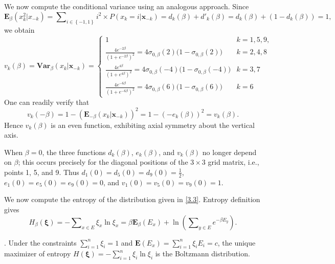 \documentclass[twoside]{article}
\begin{document}
We now compute the conditional variance using an analogous approach. Since
\[{{\boldsymbol{E}}_{\beta }}\left( x_{k}^{2}|{{x}_{-k}} \right)=\sum\nolimits_{i\in \left\{ -1,1 \right\}}{{{i}^{2}}\times P\left( {{x}_{k}}=i|{{\boldsymbol{x}}_{-k}} \right)}={{d}_{k}}\left( \beta \right)+{{{d}'}_{k}}\left( \beta \right)={{d}_{k}}\left( \beta \right)+\left( 1-{{d}_{k}}\left( \beta \right) \right)=1,\]
we obtain
\[
v_k(\beta) = {\boldsymbol{Var}_{\beta }}\left( {{x}_{k}}|{\boldsymbol{x}_{-k}} \right) =
\begin{cases}
    1 & k = 1, 5, 9, \\
    \frac{4e^{-2\beta}}{(1 + e^{-2\beta})^2}=4{\sigma }_{0 ,\beta}(2)\big(1-{\sigma }_{0 ,\beta}(2)\big) & k = 2, 4, 8 \\
    \frac{4e^{4\beta}}{(1 + e^{4\beta})^2}=4{\sigma }_{0 ,\beta}(-4)\big(1-{\sigma }_{0 ,\beta}(-4)\big) & k = 3, 7 \\
    \frac{4e^{-6\beta}}{(1 + e^{-6\beta})^2}=4{\sigma }_{0 ,\beta}(6)\big(1-{\sigma }_{0 ,\beta}(6)\big) & k = 6
\end{cases}
\]
One can readily verify that \[{{v}_{k}}\left( -\beta \right)=1-{{\left( {\boldsymbol{E}_{-\beta }}\left( {{x}_{k}}|{\boldsymbol{x}_{-k}} \right) \right)}^{2}}=1-{{\left( -{{e}_{k}}\left( \beta \right) \right)}^{2}}={{v}_{k}}\left( \beta \right).\] Hence ${{v}_{k}}\left( \beta \right)$ is an even function, exhibiting axial symmetry about the vertical axis.

When $\beta =0$, the three functions ${{d}_{k}}\left( \beta \right)$, ${{e}_{k}}\left( \beta \right)$, and ${{v}_{k}}\left( \beta \right)$ no longer depend on $\beta$; this occurs precisely for the diagonal positions of the $3\times 3$ grid matrix, i.e., points 1, 5, and 9.
 Thus ${{d}_{1}}\left( 0 \right)={{d}_{5}}\left( 0 \right)={{d}_{9}}\left( 0 \right)=\tfrac{1}{2}$, ${{e}_{1}}\left( 0 \right)={{e}_{5}}\left( 0 \right)={{e}_{9}}\left( 0 \right)=0$, and ${{v}_{1}}\left( 0 \right)={{v}_{5}}\left( 0 \right)={{v}_{9}}\left( 0 \right)=1$.

We now compute the entropy of the distribution given in \eqref{3.3}. Entropy definition gives
\[H_{\beta}(\boldsymbol{\xi}) = -\sum\nolimits_{x \in E} \xi_x \ln \xi_x = \beta \boldsymbol{E}_{\beta}(E_x) + \ln \left( \sum\nolimits_{y \in E} e^{-\beta E_y} \right).\]

\begin{pro} \label{pro3.7}
\citep{shams}. Under the constraints $\sum\nolimits_{i=1}^{n}{{{\xi }_{i}}}=1$ and $\boldsymbol{E}\left( {{E}_{x}} \right)=\sum\nolimits_{i=1}^{n}{{{\xi }_{i}}}{{E}_{i}}=c$, the unique maximizer of entropy $H(\boldsymbol{\xi })=-\sum\nolimits_{i=1}^{n}{{{\xi }_{i}}}\ln {{\xi }_{i}}$ is the Boltzmann distribution.
\end{pro}
\end{document}
